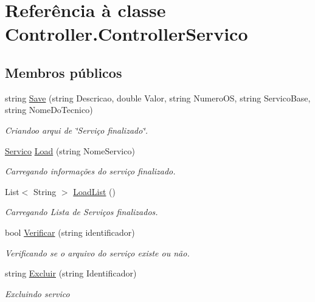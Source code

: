 \hypertarget{class_controller_1_1_controller_servico}{}\section{Referência à classe Controller.\+Controller\+Servico}
\label{class_controller_1_1_controller_servico}
\subsection*{Membros públicos}
\begin{DoxyCompactItemize}
\item 
string \hyperlink{class_controller_1_1_controller_servico_acc2c55e584e557c708cb82f3a32dcab6}{Save} (string Descricao, double Valor, string Numero\+O\+S, string Servico\+Base, string Nome\+Do\+Tecnico)
\begin{DoxyCompactList}\small\item\em Criandoo arqui de \char`\"{}\+Serviço finalizado\char`\"{}. \end{DoxyCompactList}\item 
\hyperlink{class_model_1_1_ordem__de___servico_1_1_servico}{Servico} \hyperlink{class_controller_1_1_controller_servico_a415322795242ee504b83b31f93c12045}{Load} (string Nome\+Servico)
\begin{DoxyCompactList}\small\item\em Carregando informações do serviço finalizado. \end{DoxyCompactList}\item 
List$<$ String $>$ \hyperlink{class_controller_1_1_controller_servico_a3f092cb4043b6722d0b7192dde5c55e0}{Load\+List} ()
\begin{DoxyCompactList}\small\item\em Carregando Lista de Serviços finalizados. \end{DoxyCompactList}\item 
bool \hyperlink{class_controller_1_1_controller_servico_a3267ab2de653fc0d3cd5506948cd071d}{Verificar} (string identificador)
\begin{DoxyCompactList}\small\item\em Verificando se o arquivo do serviço existe ou não. \end{DoxyCompactList}\item 
string \hyperlink{class_controller_1_1_controller_servico_afc8dda6094698317e1540ca40649b3d5}{Excluir} (string Identificador)
\begin{DoxyCompactList}\small\item\em Excluindo servico \end{DoxyCompactList}\end{DoxyCompactItemize}


